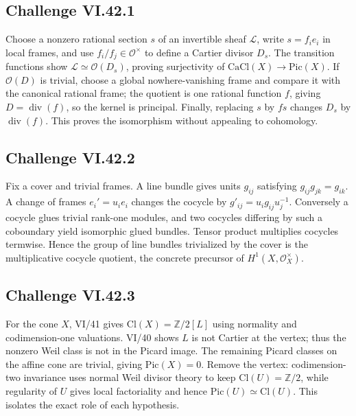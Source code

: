 \subsection*{Challenge VI.42.1}
\begin{solution}
Choose a nonzero rational section \(s\) of an invertible sheaf \(\mathcal L\), write \(s=f_i e_i\) in local frames, and use \(f_i/f_j\in\mathcal O^\times\) to define a Cartier divisor \(D_s\).  The transition functions show \(\mathcal L\simeq\mathcal O(D_s)\), proving surjectivity of \(\mathrm{CaCl}(X)\to\mathrm{Pic}(X)\).  If \(\mathcal O(D)\) is trivial, choose a global nowhere-vanishing frame and compare it with the canonical rational frame; the quotient is one rational function \(f\), giving \(D=\operatorname{div}(f)\), so the kernel is principal.  Finally, replacing \(s\) by \(fs\) changes \(D_s\) by \(\operatorname{div}(f)\).  This proves the isomorphism without appealing to cohomology.
\end{solution}

\subsection*{Challenge VI.42.2}
\begin{solution}
Fix a cover and trivial frames.  A line bundle gives units \(g_{ij}\) satisfying \(g_{ij}g_{jk}=g_{ik}\).  A change of frames \(e_i'=u_i e_i\) changes the cocycle by \(g'_{ij}=u_i g_{ij}u_j^{-1}\).  Conversely a cocycle glues trivial rank-one modules, and two cocycles differing by such a coboundary yield isomorphic glued bundles.  Tensor product multiplies cocycles termwise.  Hence the group of line bundles trivialized by the cover is the multiplicative cocycle quotient, the concrete precursor of \(H^1(X,\mathcal O_X^\times)\).
\end{solution}

\subsection*{Challenge VI.42.3}
\begin{solution}
For the cone \(X\), VI/41 gives \(\mathrm{Cl}(X)=\mathbb Z/2[L]\) using normality and codimension-one valuations.  VI/40 shows \(L\) is not Cartier at the vertex; thus the nonzero Weil class is not in the Picard image.  The remaining Picard classes on the affine cone are trivial, giving \(\mathrm{Pic}(X)=0\).  Remove the vertex: codimension-two invariance uses normal Weil divisor theory to keep \(\mathrm{Cl}(U)=\mathbb Z/2\), while regularity of \(U\) gives local factoriality and hence \(\mathrm{Pic}(U)\simeq\mathrm{Cl}(U)\).  This isolates the exact role of each hypothesis.
\end{solution}

